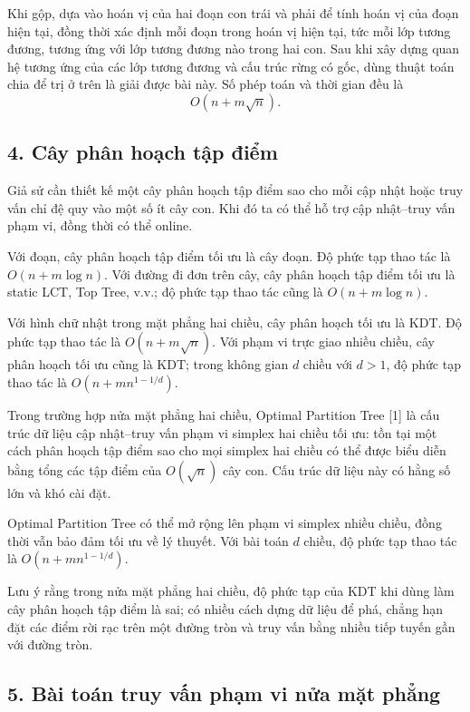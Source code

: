 \documentclass[11pt]{article}
\begin{document}
Khi gộp, dựa vào hoán vị của hai đoạn con trái và phải để tính hoán vị của đoạn
hiện tại, đồng thời xác định mỗi đoạn trong hoán vị hiện tại, tức mỗi lớp tương
đương, tương ứng với lớp tương đương nào trong hai con. Sau khi xây dựng quan
hệ tương ứng của các lớp tương đương và cấu trúc rừng có gốc, dùng thuật toán
chia để trị ở trên là giải được bài này. Số phép toán và thời gian đều là
\[
  O(n+m\sqrt n).
\]

\subsection*{4. Cây phân hoạch tập điểm}

Giả sử cần thiết kế một cây phân hoạch tập điểm sao cho mỗi cập nhật hoặc truy
vấn chỉ đệ quy vào một số ít cây con. Khi đó ta có thể hỗ trợ cập nhật--truy
vấn phạm vi, đồng thời có thể online.

Với đoạn, cây phân hoạch tập điểm tối ưu là cây đoạn. Độ phức tạp thao tác là
\(O(n+m\log n)\). Với đường đi đơn trên cây, cây phân hoạch tập điểm tối ưu là
static LCT, Top Tree, v.v.; độ phức tạp thao tác cũng là \(O(n+m\log n)\).

Với hình chữ nhật trong mặt phẳng hai chiều, cây phân hoạch tối ưu là KDT. Độ
phức tạp thao tác là \(O(n+m\sqrt n)\). Với phạm vi trực giao nhiều chiều, cây
phân hoạch tối ưu cũng là KDT; trong không gian \(d\) chiều với \(d>1\), độ
phức tạp thao tác là \(O(n+mn^{1-1/d})\).

Trong trường hợp nửa mặt phẳng hai chiều, Optimal Partition Tree [1] là cấu
trúc dữ liệu cập nhật--truy vấn phạm vi simplex hai chiều tối ưu: tồn tại một
cách phân hoạch tập điểm sao cho mọi simplex hai chiều có thể được biểu diễn
bằng tổng các tập điểm của \(O(\sqrt n)\) cây con. Cấu trúc dữ liệu này có hằng
số lớn và khó cài đặt.

Optimal Partition Tree có thể mở rộng lên phạm vi simplex nhiều chiều, đồng
thời vẫn bảo đảm tối ưu về lý thuyết. Với bài toán \(d\) chiều, độ phức tạp
thao tác là \(O(n+mn^{1-1/d})\).

Lưu ý rằng trong nửa mặt phẳng hai chiều, độ phức tạp của KDT khi dùng làm cây
phân hoạch tập điểm là sai; có nhiều cách dựng dữ liệu để phá, chẳng hạn đặt
các điểm rời rạc trên một đường tròn và truy vấn bằng nhiều tiếp tuyến gần với
đường tròn.

\subsection*{5. Bài toán truy vấn phạm vi nửa mặt phẳng}
\end{document}
